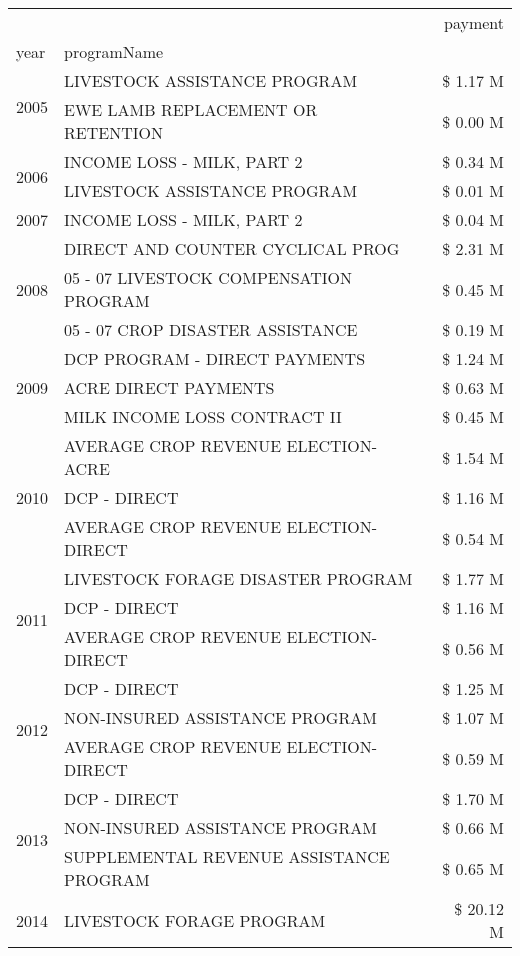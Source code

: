 \begin{tabular}{llr}
\toprule
 &  & payment \\
year & programName &  \\
\midrule
\multirow[t]{2}{*}{2005} & LIVESTOCK ASSISTANCE PROGRAM & \$ 1.17 M \\
 & EWE LAMB REPLACEMENT OR RETENTION & \$ 0.00 M \\
\cline{1-3}
\multirow[t]{2}{*}{2006} & INCOME LOSS - MILK, PART 2 & \$ 0.34 M \\
 & LIVESTOCK ASSISTANCE PROGRAM & \$ 0.01 M \\
\cline{1-3}
2007 & INCOME LOSS - MILK, PART 2 & \$ 0.04 M \\
\cline{1-3}
\multirow[t]{3}{*}{2008} & DIRECT AND COUNTER CYCLICAL PROG & \$ 2.31 M \\
 & 05 - 07 LIVESTOCK COMPENSATION PROGRAM & \$ 0.45 M \\
 & 05 - 07 CROP DISASTER ASSISTANCE & \$ 0.19 M \\
\cline{1-3}
\multirow[t]{3}{*}{2009} & DCP PROGRAM - DIRECT PAYMENTS & \$ 1.24 M \\
 & ACRE DIRECT PAYMENTS & \$ 0.63 M \\
 & MILK INCOME LOSS CONTRACT II & \$ 0.45 M \\
\cline{1-3}
\multirow[t]{3}{*}{2010} & AVERAGE CROP REVENUE ELECTION-ACRE & \$ 1.54 M \\
 & DCP - DIRECT & \$ 1.16 M \\
 & AVERAGE CROP REVENUE ELECTION-DIRECT & \$ 0.54 M \\
\cline{1-3}
\multirow[t]{3}{*}{2011} & LIVESTOCK FORAGE DISASTER PROGRAM & \$ 1.77 M \\
 & DCP - DIRECT & \$ 1.16 M \\
 & AVERAGE CROP REVENUE ELECTION-DIRECT & \$ 0.56 M \\
\cline{1-3}
\multirow[t]{3}{*}{2012} & DCP - DIRECT & \$ 1.25 M \\
 & NON-INSURED ASSISTANCE PROGRAM & \$ 1.07 M \\
 & AVERAGE CROP REVENUE ELECTION-DIRECT & \$ 0.59 M \\
\cline{1-3}
\multirow[t]{3}{*}{2013} & DCP - DIRECT & \$ 1.70 M \\
 & NON-INSURED ASSISTANCE PROGRAM & \$ 0.66 M \\
 & SUPPLEMENTAL REVENUE ASSISTANCE PROGRAM & \$ 0.65 M \\
\cline{1-3}
\multirow[t]{3}{*}{2014} & LIVESTOCK FORAGE PROGRAM & \$ 20.12 M \\

\end{tabular}
